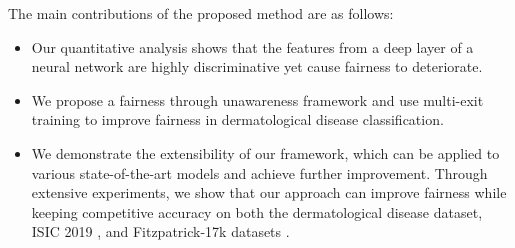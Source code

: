 

The main contributions of the proposed method are as follows: 

\begin{itemize}
    \item Our quantitative analysis shows that the features from a deep layer of a neural network are highly discriminative yet cause fairness to deteriorate.
    \item We propose a fairness through unawareness framework and use multi-exit training to improve fairness in dermatological disease classification.
    \item We demonstrate the extensibility of our framework, which can be applied to various state-of-the-art models and achieve further improvement. Through extensive experiments, we show that our approach can improve fairness while keeping competitive accuracy on both the dermatological disease dataset, ISIC 2019 \cite{combalia2019bcn20000}, and Fitzpatrick-17k datasets \cite{groh2021evaluating}. 

\end{itemize}

